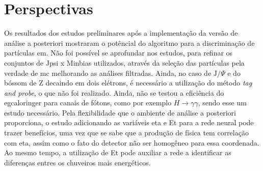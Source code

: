   
\section{Perspectivas}

Os resultados dos estudos preliminares após a implementação da versão de análise
a posteriori mostraram o potêncial do algoritmo para a discriminação de
partículas \gls{em}. Não foi possível se aprofundar nos estudos, para refinar os
conjuntos de Jpsi x Minbias utilizados, através da seleção das partículas pela
verdade de \gls{mc} melhorando as análises filtradas. Ainda, no caso de
$\text{J}/\Psi$ e do bóssom de Z decaindo em dois elétrons, é necessário a
utilização do método \emph{tag and probe}, o que não foi realizado.
Ainda, não se testou a eficiência do \gls{egcaloringer} para canais de fótons,
como por exemplo $H\rightarrow\gamma\gamma$, sendo esse um estudo necessário.
Pela flexibilidade que o ambiente de análise a posteriori proporciona, o estudo
adicionando as variáveis \gls{eta} e \gls{Et} para a rede neural pode trazer
benefícios, uma vez que se sabe que a produção de física tem correlação com
\gls{eta}, assim como o fato do detector não ser homogêneo para essa coordenada.
Ao mesmo tempo, a utilização de \gls{Et} pode auxiliar a rede a identificar as
diferenças entres os chuveiros mais energéticos.



